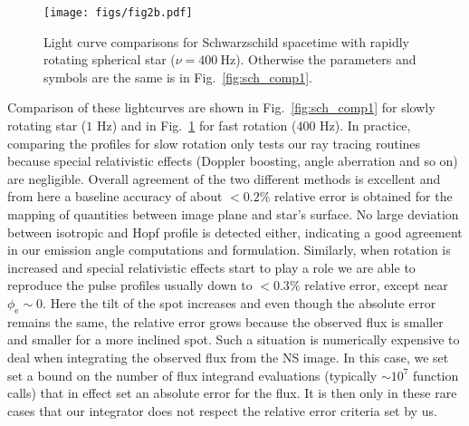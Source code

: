 \documentclass{aa}
\newcommand{\sch}{Schwarzschild }
\newcommand{\Msun}{\ensuremath{M_{\odot}}}
\begin{document}
\begin{figure}
\centering
\texttt{[image: figs/fig2b.pdf]}
\caption{\label{fig:sch_comp400}
  Light curve comparisons for \sch spacetime with rapidly rotating spherical star ($\nu = 400~\mathrm{Hz}$).
  Otherwise the parameters and symbols are the same is in Fig.~\ref{fig:sch_comp1}.
}
\end{figure}


Comparison of these lightcurves are shown in Fig.~\ref{fig:sch_comp1} for slowly rotating star ($1$ Hz) and in Fig.~\ref{fig:sch_comp400} for fast rotation ($400$ Hz).
In practice, comparing the profiles for slow rotation only tests our ray tracing routines because special relativistic effects (Doppler boosting, angle aberration and so on) are negligible.
Overall agreement of the two different methods is excellent and from here a baseline accuracy of about $<0.2\%$ relative error is obtained for the mapping of quantities between image plane and star's surface.
No large deviation between isotropic and Hopf profile is detected either, indicating a good agreement in our emission angle computations and formulation.
Similarly, when rotation is increased and special relativistic effects start to play a role we are able to reproduce the pulse profiles usually down to $<0.3\%$ relative error, except near $\phi_{\mathrm{e}} \sim 0$.
Here the tilt of the spot increases and even though the absolute error remains the same, the relative error grows because the observed flux is smaller and smaller for a more inclined spot.
Such a situation is numerically expensive to deal when integrating the observed flux from the NS image.
In this case, we set set a bound on the number of flux integrand evaluations (typically $\sim 10^7$ function calls) that in effect set an absolute error for the flux.
It is then only in these rare cases that our integrator does not respect the relative error criteria set by us.


\end{document}
